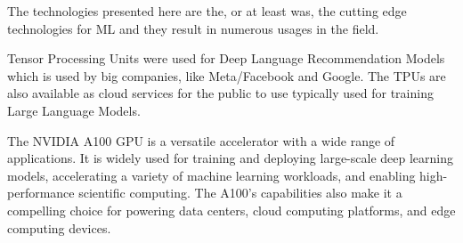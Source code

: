 The technologies presented here are the, or at least was, the cutting edge technologies for ML and
they result in numerous usages in the field. 

Tensor Processing Units were used for Deep Language Recommendation Models which is used by big companies, like Meta/Facebook and Google. \cite{b9}
The TPUs are also available as cloud services for the public to use typically used for training Large Language Models.

The NVIDIA A100 GPU is a versatile accelerator with a wide range of applications.
It is widely used for training and deploying large-scale deep learning models, accelerating a variety of machine learning workloads, and enabling high-performance scientific computing.
The A100's capabilities also make it a compelling choice for powering data centers, cloud computing platforms, and edge computing devices.